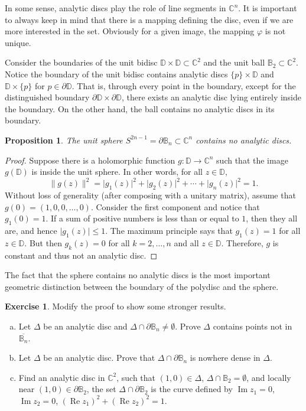 \documentclass[12pt,openany]{book}
\renewcommand{\Re}{\operatorname{Re}}
\renewcommand{\Im}{\operatorname{Im}}
\newcommand{\sabs}[1]{\lvert {#1} \rvert}
\newcommand{\snorm}[1]{\lVert {#1} \rVert}
\newcommand{\C}{{\mathbb{C}}}
\newcommand{\D}{{\mathbb{D}}}
\newcommand{\bB}{{\mathbb{B}}}
\theoremstyle{plain}
\newtheorem{prop}[thm]{Proposition}
\theoremstyle{remark}
\theoremstyle{definition}
\newenvironment{exbox}{%
    \def\FrameCommand{\vrule width 1pt \relax\hspace{10pt}}%
    \MakeFramed{\advance\hsize-\width\FrameRestore}%
}{%
    \endMakeFramed
}
\newenvironment{exparts}{%
    \leavevmode\begin{enumerate}[a),noitemsep,topsep=0pt,parsep=0pt,partopsep=0pt]
}{%
    \end{enumerate}
}
\theoremstyle{exercise}
\newtheorem{exercise}{Exercise}[section]
\theoremstyle{example}
\begin{document}
In some sense, analytic discs play the role of line segments in $\C^n$.  It
is important to always keep in mind that there is a mapping defining the
disc, even if we are more interested in the set.  Obviously for a given
image, the mapping $\varphi$ is not unique.

Consider the boundaries of
the unit bidisc $\D \times \D \subset \C^2$
and the unit ball $\bB_2 \subset \C^2$.
Notice the boundary of the unit bidisc contains analytic discs
$\{p\} \times \D$
and $\D \times \{p\}$ for $p \in \partial \D$.
That is, through every point in the boundary, except for the distinguished
boundary $\partial \D \times \partial \D$, there exists an analytic disc
lying entirely inside the boundary.  On the other hand, the ball
contains no analytic discs in its boundary.

\begin{prop}\label{prop:noanaldiscinsphere}
%
The unit sphere $S^{2n-1} = \partial \bB_n \subset \C^n$
contains no analytic discs.
\end{prop}

\begin{proof}
Suppose there is a holomorphic function $g \colon \D \to \C^n$
such that the image $g(\D)$ is inside the unit sphere.  In other words,
for all $z \in \D$,
\begin{equation*}
\snorm{g(z)}^2
= \sabs{g_1(z)}^2 + \sabs{g_2(z)}^2 + \cdots + \sabs{g_n(z)}^2 = 1 .
\end{equation*}
Without loss of generality (after composing with a unitary matrix),
assume that $g(0) = (1,0,0,\ldots,0)$.
Consider the first component and notice that $g_1(0) = 1$.
If a sum of positive numbers is less than or equal to $1$,
then they all are, and hence $\sabs{g_1(z)} \leq 1$.
The maximum principle says
that $g_1(z) = 1$ for all $z \in \D$.  But then $g_k(z) = 0$
for all $k=2,\ldots,n$ and all $z \in \D$.  Therefore, $g$ is constant and
thus not an analytic disc.
\end{proof}

The fact that the sphere contains no analytic discs
is the most important geometric distinction between the boundary of
the polydisc and the sphere.

\begin{exbox}
\begin{exercise}
Modify the proof to show some stronger results.
\begin{exparts}
\item
Let $\Delta$ be an analytic disc
and $\Delta \cap \partial \bB_n \not= \emptyset$.
Prove $\Delta$ contains points not in
$\overline{\bB_n}$.
\item
Let $\Delta$ be an analytic disc.
Prove that $\Delta \cap \partial \bB_n$ is nowhere dense in $\Delta$.
\item
Find an analytic disc in $\C^2$, such that $(1,0) \in \Delta$, $\Delta \cap \bB_2 =
\emptyset$, and locally near
$(1,0) \in \partial \bB_2$, the set
$\Delta \cap \partial \bB_2$ is the
curve defined by $\Im z_1=0$, $\Im z_2=0$,
${(\Re z_1)}^2+ {(\Re z_2)}^2 = 1$.
\end{exparts}
\end{exercise}
\end{exbox}
\end{document}
